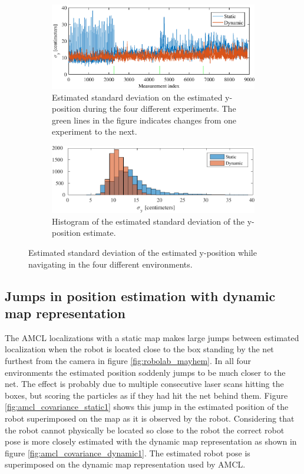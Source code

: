\begin{figure}[htbp]
	\begin{subfigure}[t]{1\textwidth}	
		\centering	
		\includegraphics[scale=1.0]{chapters/evaluation/figures/location_data_y}	
		\caption{Estimated standard deviation on the estimated y-position during the four different experiments. The green lines in the figure indicates changes from one experiment to the next.}
		\label{fig:location_data_y}
	\end{subfigure}
	
	\begin{subfigure}[t]{1\textwidth}
		\centering
		\includegraphics[scale=1.0]{chapters/evaluation/figures/location_data_hist_y-crop}
		\caption{Histogram of the estimated standard deviation of the y-position estimate.}
		\label{fig:location_data_hist_y}
	\end{subfigure}
	\caption{Estimated standard deviation of the estimated y-position while navigating in the four different environments.}
	\label{fig:location_y_evaluation}
\end{figure}

\subsection{Jumps in position estimation with dynamic map representation}
The AMCL localizations with a static map makes large jumps between estimated localization when the robot is located close to the box standing by the net furthest from the camera in figure \ref{fig:robolab_mayhem}. 
In all four environments the estimated position soddenly jumps to be much closer to the net. 
The effect is probably due to multiple consecutive laser scans hitting the boxes, but scoring the particles as if they had hit the net behind them.
Figure \ref{fig:amcl_covariance_static1} shows this jump in the estimated position of the robot superimposed on the map as it is observed by the robot.
Considering that the robot cannot physically be located so close to the robot the correct robot pose is more closely estimated with the dynamic map representation as shown in figure \ref{fig:amcl_covariance_dynamic1}.
The estimated robot pose is superimposed on the dynamic map representation used by AMCL.

